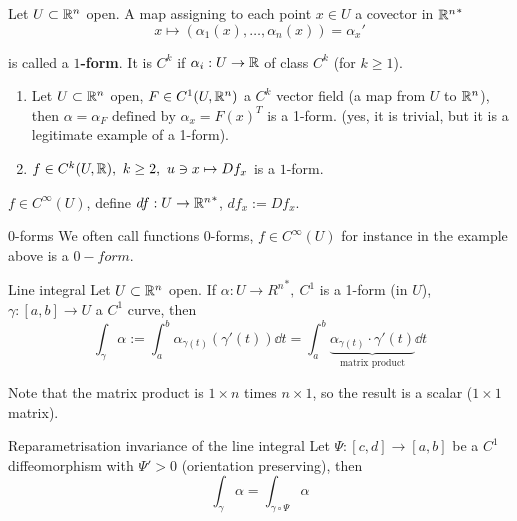 \documentclass[12pt]{article}
\begin{document}
\begin{definition}{}{}
    Let $U \subset \mathbb{R}^n$ open. A map assigning to each point $x \in U$ a covector in ${\mathbb{R}^n}^*$ 
    $$
    x \mapsto (\alpha_1(x),\dots,\alpha_n(x)) = \alpha_x'
    $$ 
    
    is called a \textbf{$1$-form}. It is $C^k$ if $\alpha_i: U \rightarrow \mathbb{R}$ of class $C^k$ (for $k \geq 1$).
\end{definition}

\begin{example}{}{}
    \begin{enumerate}[label=\alph*)]
        \item Let $U \subset \mathbb{R}^n$ open, $F\in C^1(U, \mathbb{R}^n)$ a $C^k$ vector field (a map from $U$ to $\mathbb{R}^n$), then
        $
            \alpha = \alpha_F \text{ defined by } \alpha_x = F(x)^T
        $ is a 1-form. (yes, it is trivial, but it is a legitimate example of a 1-form).

        \item $f \in C^k(U, \mathbb{R}),\ k \geq 2,\ u \ni x \mapsto D f_x$ is a $1$-form.
    \end{enumerate}
\end{example}

\begin{definition}{}{}
    $f \in C^\infty(U)$, define $df: U \rightarrow {\mathbb{R}^n}^*$, $df_x := Df_x$.
\end{definition}

\begin{notebox}{0-forms}{}
    We often call functions $0$-forms, $f \in C^\infty(U)$ for instance in the example above is a $0-form$.
\end{notebox}

\begin{definition}{Line integral}{}
    Let $U \subset \mathbb{R}^n$ open. If $\alpha: U \rightarrow {R^n}^*,\ C^1$ is a 1-form (in $U$), $\gamma: [a, b] \rightarrow U$ a $C^1$ curve, then 
    $$
        \int_\gamma \alpha := \int_{a}^{b} \alpha_{\gamma(t)} \left( \gamma'(t) \right) \dd t = \int_{a}^{b} \underbrace{\alpha_{\gamma(t)} \cdot \gamma'(t)}_{\text{matrix product}} \dd t
    $$

    Note that the matrix product is $1 \times n$ times $n \times 1$, so the result is a scalar ($1 \times 1$ matrix).
\end{definition}

\begin{lemma}{Reparametrisation invariance of the line integral}{}
    Let $\Psi: [c, d] \rightarrow [a, b]$ be a $C^1$ diffeomorphism with $\Psi' > 0$ (orientation preserving), then
    $$
        \int_\gamma \alpha = \int_{\gamma \circ \Psi} \alpha
    $$
\end{lemma}
\end{document}
